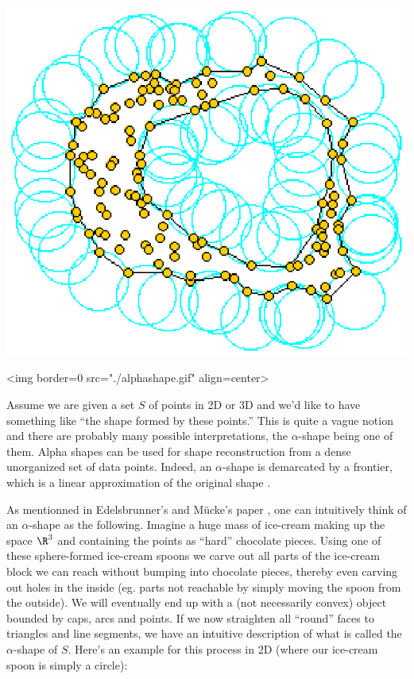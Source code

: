 \begin{ccTexOnly}
\vspace*{-1cm}
\includegraphics{alphashape.eps} 
\end{ccTexOnly}
\begin{ccHtmlOnly}
<img border=0 src="./alphashape.gif"  align=center>
\end{ccHtmlOnly}

Assume we are given a set $S$ of points in 2D or 3D and we'd like to
have something like ``the shape formed by these points.'' This is
quite a vague notion and there are probably many possible
interpretations, the $\alpha$-shape being one of them. Alpha shapes
can be used for shape reconstruction from a dense unorganized set of
data points. Indeed, an $\alpha$-shape is demarcated by a frontier,
which is a linear approximation of the original shape \cite{bb-srmua-97t}.

As mentionned in Edelsbrunner's and M\"ucke's paper \cite{em-tdas-94},
one can intuitively think of an $\alpha$-shape as the
following. Imagine a huge mass of ice-cream making up the space $\R^3$
and containing the points as ``hard'' chocolate pieces. Using one of
these sphere-formed ice-cream spoons we carve out all parts of the
ice-cream block we can reach without bumping into chocolate pieces,
thereby even carving out holes in the inside (eg. parts not reachable
by simply moving the spoon from the outside). We will eventually end
up with a (not necessarily convex) object bounded by caps, arcs and
points. If we now straighten all ``round'' faces to triangles and line
segments, we have an intuitive description of what is called the
$\alpha$-shape of $S$. Here's an example for this process in 2D (where
our ice-cream spoon is simply a circle):
                                                                        
